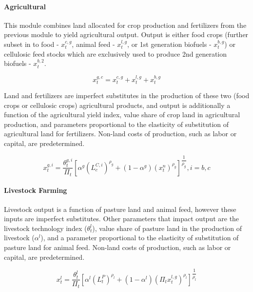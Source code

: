 \documentclass[10pt]{article}
\begin{document}
\paragraph{Agricultural}

This module combines land allocated for crop production and fertilizers from the previous module to yield agricultural output. Output is either food crops (further subset in to food - $x_t^{c, g}$, animal feed - $x_t^{l,g}$, or 1st generation biofuels - $x_t^{b,g}$) or cellulosic feed stocks which are exclusively used to produce 2nd generation biofuels - $x_t^{b,2}$. 

\begin{equation}
x_t^{g,c} = x_t^{c,g} + x_t^{l,g} + x_t^{b,g}
\end{equation}

Land and fertilizers are imperfect substitutes in the production of these two (food crops or cellulosic crops) agricultural products, and output is additionally a function of the agricultural yield index, value share of crop land in agricultural production, and parameters proportional to the elasticity of substitution of agricultural land for fertilizers. Non-land costs of production, such as labor or capital, are predetermined. 

\begin{equation}
x_t^{g,i} = \dfrac{\theta^{g,i}_t}{\Pi_t}\left [\alpha^g \left (L_c^{C,i} \right )^{\rho_g} + \left (1-\alpha^g \right )\left (x_t^n \right )^{\rho_g}\right ]^{\dfrac{1}{\rho_g}} , i = b, c
\end{equation}

\paragraph{Livestock Farming}

Livestock output is a function of pasture land and animal feed, however these inputs are imperfect substitutes. Other parameters that impact output are the livestock technology index ($\theta_t^l$), value share of pasture land in the production of livestock ($\alpha^l$), and a parameter proportional to the elasticity of substitution of pasture land for animal feed. Non-land costs of production, such as labor or capital, are predetermined. 

\begin{equation}
x_t^l = \dfrac{\theta_t^l}{\Pi_t} \left [ \alpha^l \left (L_t^P \right )^{\rho_l} + \left (1-\alpha^l \right) \left (\Pi_t x_t^{l,g} \right )^{\rho_l} \right ]^{\dfrac{1}{\rho_l}}
\end{equation}
\end{document}
